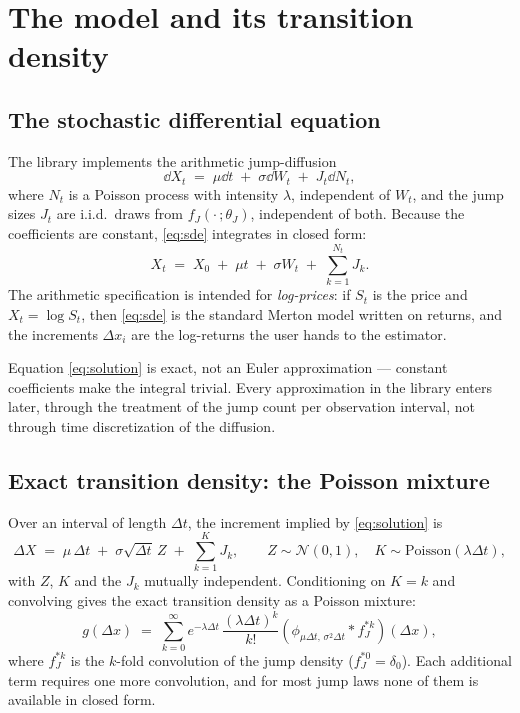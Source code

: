 \section{The model and its transition density}
\label{sec:model}

\subsection{The stochastic differential equation}

The library implements the arithmetic jump-diffusion
\begin{equation}
  \dd X_t \;=\; \mu \dd t \;+\; \sigma \dd W_t \;+\; J_t \dd N_t,
  \label{eq:sde}
\end{equation}
where $N_t$ is a Poisson process with intensity $\lambda$, independent of
$W_t$, and the jump sizes $J_t$ are i.i.d.\ draws from
$f_J(\cdot\,;\theta_J)$, independent of both. Because the coefficients are
constant, \eqref{eq:sde} integrates in closed form:
\begin{equation}
  X_t \;=\; X_0 \;+\; \mu t \;+\; \sigma W_t \;+\; \sum_{k=1}^{N_t} J_k .
  \label{eq:solution}
\end{equation}
The arithmetic specification is intended for \emph{log-prices}: if $S_t$
is the price and $X_t = \log S_t$, then \eqref{eq:sde} is the standard
Merton model written on returns, and the increments
$\Delta x_i$ are the log-returns the user hands to the estimator.

\begin{remark}
Equation \eqref{eq:solution} is exact, not an Euler approximation ---
constant coefficients make the integral trivial. Every approximation in
the library enters later, through the treatment of the jump count per
observation interval, not through time discretization of the diffusion.
\end{remark}

\subsection{Exact transition density: the Poisson mixture}

Over an interval of length $\Delta t$, the increment implied by
\eqref{eq:solution} is
\begin{equation}
  \Delta X \;=\; \mu\,\Delta t \;+\; \sigma \sqrt{\Delta t}\, Z
  \;+\; \sum_{k=1}^{K} J_k,
  \qquad Z \sim \mathcal N(0,1),\quad
  K \sim \mathrm{Poisson}(\lambda \Delta t),
  \label{eq:increment}
\end{equation}
with $Z$, $K$ and the $J_k$ mutually independent. Conditioning on
$K = k$ and convolving gives the exact transition density as a Poisson
mixture:
\begin{equation}
  g(\Delta x)
  \;=\;
  \sum_{k=0}^{\infty}
  e^{-\lambda \Delta t}\,\frac{(\lambda \Delta t)^k}{k!}
  \left( \phi_{\mu \Delta t,\, \sigma^2 \Delta t} * f_J^{*k} \right)
  (\Delta x),
  \label{eq:poisson-mixture}
\end{equation}
where $f_J^{*k}$ is the $k$-fold convolution of the jump density
($f_J^{*0} = \delta_0$). Each additional term requires one more
convolution, and for most jump laws none of them is available in closed
form.

